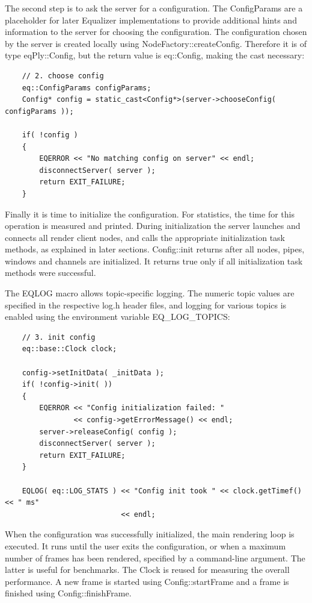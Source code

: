 \documentclass[10pt,a4]{scrartcl}
\begin{document}
The second step is to ask the server for a configuration. The
\textsf{ConfigParams} are a placeholder for later Equalizer
implementations to provide additional hints and information to the
server for choosing the configuration. The configuration chosen by the
server is created locally using
\textsf{NodeFactory::createConfig}. Therefore it is of type
\textsf{eqPly::Config}, but the return value is \textsf{eq::Config},
making the cast necessary:

{\footnotesize\begin{lstlisting}
    // 2. choose config
    eq::ConfigParams configParams;
    Config* config = static_cast<Config*>(server->chooseConfig( configParams ));

    if( !config )
    {
        EQERROR << "No matching config on server" << endl;
        disconnectServer( server );
        return EXIT_FAILURE;
    }
\end{lstlisting}}%

Finally it is time to initialize the configuration. For statistics, the
time for this operation is measured and printed. During initialization
the server launches and connects all render client nodes, and calls the
appropriate initialization task methods, as explained in later
sections. \textsf{Config::init} returns after all nodes, pipes,
windows and channels are initialized. It returns \textsf{true} only if
all initialization task methods were successful.

The \textsf{EQLOG} macro allows topic-specific logging. The numeric
topic values are specified in the respective \textsf{log.h} header
files, and logging for various topics is enabled using the environment
variable \textsf{EQ\_LOG\_TOPICS}:

{\footnotesize\begin{lstlisting}
    // 3. init config
    eq::base::Clock clock;

    config->setInitData( _initData );
    if( !config->init( ))
    {
        EQERROR << "Config initialization failed: " 
                << config->getErrorMessage() << endl;
        server->releaseConfig( config );
        disconnectServer( server );
        return EXIT_FAILURE;
    }

    EQLOG( eq::LOG_STATS ) << "Config init took " << clock.getTimef() << " ms"
                           << endl;
\end{lstlisting}}%

When the configuration was successfully initialized, the main rendering
loop is executed. It runs until the user exits the
configuration, or when a maximum number of frames has been rendered,
specified by a command-line argument. The latter is useful for
benchmarks. The \textsf{Clock} is reused for measuring the overall
performance. A new frame is started using \textsf{Config::startFrame}
and a frame is finished using \textsf{Config::finishFrame}.
\end{document}
